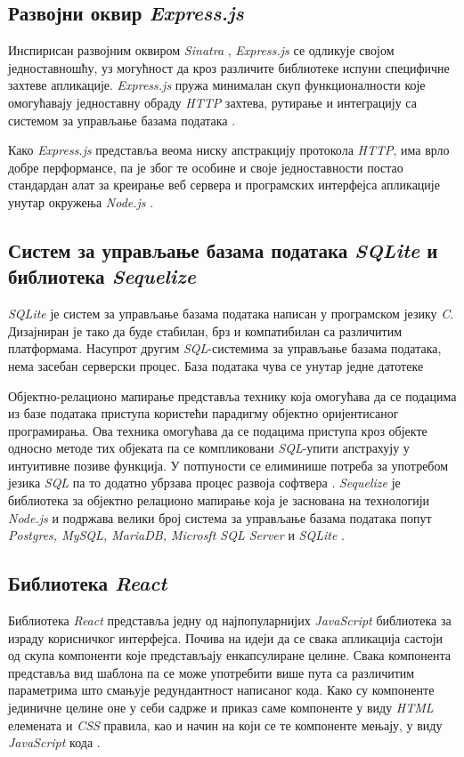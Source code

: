 \documentclass[12pt,oneside]{memoir}
\begin{document}
\subsection{Развојни оквир \textit{Express.js}}

Инспирисан развојним оквиром \textit{Sinatra} \cite{sinatra}, \textit{Express.js} се одликује својом једноставношћу, уз могућност да кроз различите библиотеке испуни специфичне захтеве апликације. \textit{Express.js} пружа минималан скуп функционалности које омогућавају једноставну обраду \textit{HTTP} захтева, рутирање и интеграцију са системом за управљање базама података \cite{express}. 

Како \textit{Express.js} представља веома ниску апстракцију протокола \textit{HTTP}, има врло добре перформансе, па је због те особине и своје једноставности постао стандардан алат за креирање веб сервера и програмских интерфејса апликације унутар окружења \textit{Node.js } \cite{mdnexpress}.

\subsection{Систем за управљање базама података \textit{SQLite} и библиотека \textit{Sequelize}}

\textit{SQLite} је систем за управљање базама података написан у програмском језику \textit{C}. Дизајниран је тако да буде стабилан, брз и компатибилан са различитим платформама.  Насупрот другим \textit{SQL}-системима за управљање базама података, нема засебан серверски процес. База података чува се унутар једне датотеке \cite{sqlite,sqlitetutorial}

Објектно-релационо мапирање представља технику која омогућава да се подацима из базе података приступа користећи парадигму објектно оријентисаног програмирања. Ова техника омогућава да се подацима приступа кроз објекте односно методе тих објеката па се компликовани \textit{SQL}-упити апстрахују у интуитивне позиве функција. У потпуности се елиминише потреба за употребом језика \textit{SQL} па то додатно убрзава процес развоја софтвера \cite{orm}. \textit{Sequelize} је библиотека за објектно релационо мапирање која је заснована на технологији \textit{ Node.js} и подржава велики број система за управљање базама података попут \textit{Postgres, MySQL, MariaDB, Microsft SQL Server} и \textit{SQLite} \cite{sequelize}.

\subsection{Библиотека \textit{React}}
\label{section:react}
Библиотека \textit{React} представља једну од најпопуларнијих \textit{JavaScript} библиотека за израду корисничког интерфејса.  Почива на идеји да се свака апликација састоји од скупа компоненти које представљају енкапсулиране целине. Свака компонента представља вид шаблона па се може употребити више пута са различитим параметрима што смањује редундантност написаног кода. Како су компоненте јединичне целине оне у себи садрже и приказ саме компоненте у виду \textit{HTML} елемената и \textit{CSS} правила, као и начин на који се те компоненте мењају, у виду \textit{JavaScript} кода \cite{react}.
\end{document}
